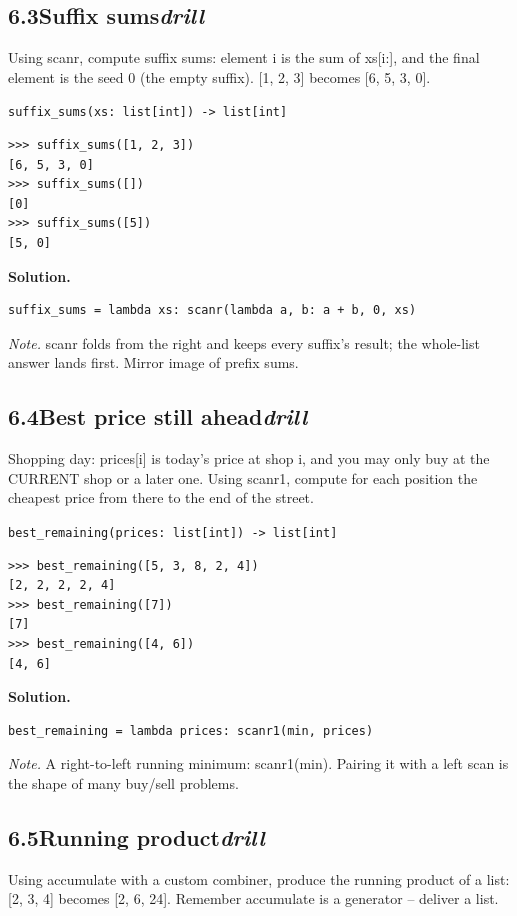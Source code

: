 \documentclass[10pt,letterpaper]{book}
\begin{document}
\subsection*{6.3\quad Suffix sums\hfill\textnormal{\textit{drill}}}
Using scanr, compute suffix sums: element i is the sum of xs[i:], and the final element is the seed 0 (the empty suffix). [1, 2, 3] becomes [6, 5, 3, 0].

\noindent\texttt{suffix\_sums(xs: list[int]) -> list[int]}
\begin{lstlisting}[style=ex]
>>> suffix_sums([1, 2, 3])
[6, 5, 3, 0]
>>> suffix_sums([])
[0]
>>> suffix_sums([5])
[5, 0]
\end{lstlisting}
\noindent\textbf{Solution.}
\begin{lstlisting}[style=code]
suffix_sums = lambda xs: scanr(lambda a, b: a + b, 0, xs)
\end{lstlisting}
\noindent\textit{Note.} scanr folds from the right and keeps every suffix's result; the whole-list answer lands first. Mirror image of prefix sums.

\subsection*{6.4\quad Best price still ahead\hfill\textnormal{\textit{drill}}}
Shopping day: prices[i] is today's price at shop i, and you may only buy at the CURRENT shop or a later one. Using scanr1, compute for each position the cheapest price from there to the end of the street.

\noindent\texttt{best\_remaining(prices: list[int]) -> list[int]}
\begin{lstlisting}[style=ex]
>>> best_remaining([5, 3, 8, 2, 4])
[2, 2, 2, 2, 4]
>>> best_remaining([7])
[7]
>>> best_remaining([4, 6])
[4, 6]
\end{lstlisting}
\noindent\textbf{Solution.}
\begin{lstlisting}[style=code]
best_remaining = lambda prices: scanr1(min, prices)
\end{lstlisting}
\noindent\textit{Note.} A right-to-left running minimum: scanr1(min). Pairing it with a left scan is the shape of many buy/sell problems.

\subsection*{6.5\quad Running product\hfill\textnormal{\textit{drill}}}
Using accumulate with a custom combiner, produce the running product of a list: [2, 3, 4] becomes [2, 6, 24]. Remember accumulate is a generator -- deliver a list.
\end{document}
